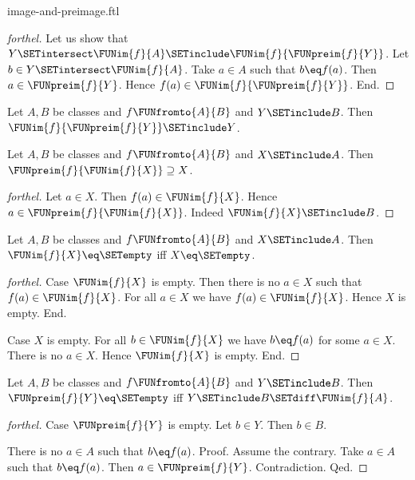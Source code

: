 \documentclass{naproche-library}
\begin{document}
\begin{smodule}[title=Computation Laws for Images and Preimages]{image-and-preimage.ftl}
\begin{proof}[forthel]
  Let us show that $Y \SETintersect \FUNim{f}{A} \SETinclude \FUNim{f}{\FUNpreim{f}{Y}}$.
    Let $b \in Y \SETintersect \FUNim{f}{A}$.
    Take $a \in A$ such that $b \eq f(a)$.
    Then $a \in \FUNpreim{f}{Y}$.
    Hence $f(a) \in \FUNim{f}{\FUNpreim{f}{Y}}$.
  End.
\end{proof}

\begin{corollary}[forthel,id=FOUNDATIONS_07_5585105345052672]
  Let $A, B$ be classes and $f \FUNfromto{A}{B}$ and $Y \SETinclude B$.
  Then $\FUNim{f}{\FUNpreim{f}{Y}} \SETinclude Y$.
\end{corollary}

\begin{proposition}[forthel,id=FOUNDATIONS_07_4890896170483712]
  Let $A, B$ be classes and $f \FUNfromto{A}{B}$ and $X \SETinclude A$.
  Then $\FUNpreim{f}{\FUNim{f}{X}} \supseteq X$.
\end{proposition}
\begin{proof}[forthel]
  Let $a \in X$.
  Then $f(a) \in \FUNim{f}{X}$.
  Hence $a \in \FUNpreim{f}{\FUNim{f}{X}}$.
  Indeed $\FUNim{f}{X} \SETinclude B$.
\end{proof}

\begin{proposition}[forthel,id=FOUNDATIONS_07_3318372355801088]
  Let $A, B$ be classes and $f \FUNfromto{A}{B}$ and $X \SETinclude A$.
  Then $\FUNim{f}{X} \eq \SETempty$ iff $X \eq \SETempty$.
\end{proposition}
\begin{proof}[forthel]
  Case $\FUNim{f}{X}$ is empty.
    Then there is no $a \in X$ such that $f(a) \in \FUNim{f}{X}$.
    For all $a \in X$ we have $f(a) \in \FUNim{f}{X}$.
    Hence $X$ is empty.
  End.

  Case $X$ is empty.
    For all $b \in \FUNim{f}{X}$ we have $b \eq f(a)$ for some $a \in X$.
    There is no $a \in X$.
    Hence $\FUNim{f}{X}$ is empty.
  End.
\end{proof}

\begin{proposition}[forthel,id=FOUNDATIONS_07_8597874786959360]
  Let $A, B$ be classes and $f \FUNfromto{A}{B}$ and $Y \SETinclude B$.
  Then $\FUNpreim{f}{Y} \eq \SETempty$ iff $Y \SETinclude B \SETdiff \FUNim{f}{A}$.
\end{proposition}
\begin{proof}[forthel]
  Case $\FUNpreim{f}{Y}$ is empty.
    Let $b \in Y$.
    Then $b \in B$.

    There is no $a \in A$ such that $b \eq f(a)$. \newline
    Proof.
      Assume the contrary.
      Take $a \in A$ such that $b \eq f(a)$.
      Then $a \in \FUNpreim{f}{Y}$.
      Contradiction.
    Qed.


\end{proof}
\end{smodule}
\end{document}
